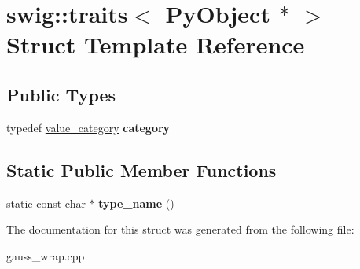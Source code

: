 \hypertarget{structswig_1_1traits_3_01_py_object_01_5_01_4}{\section{swig\-:\-:traits$<$ Py\-Object $\ast$ $>$ Struct Template Reference}
\label{structswig_1_1traits_3_01_py_object_01_5_01_4}
}
\subsection*{Public Types}
\begin{DoxyCompactItemize}
\item 
\hypertarget{structswig_1_1traits_3_01_py_object_01_5_01_4_a61e2b13476996b055b368fe035b84efc}{typedef \hyperlink{structswig_1_1value__category}{value\-\_\-category} {\bfseries category}}\label{structswig_1_1traits_3_01_py_object_01_5_01_4_a61e2b13476996b055b368fe035b84efc}

\end{DoxyCompactItemize}
\subsection*{Static Public Member Functions}
\begin{DoxyCompactItemize}
\item 
\hypertarget{structswig_1_1traits_3_01_py_object_01_5_01_4_a0d02bab40318920cce95270a10e465cd}{static const char $\ast$ {\bfseries type\-\_\-name} ()}\label{structswig_1_1traits_3_01_py_object_01_5_01_4_a0d02bab40318920cce95270a10e465cd}

\end{DoxyCompactItemize}


The documentation for this struct was generated from the following file\-:\begin{DoxyCompactItemize}
\item 
gauss\-\_\-wrap.\-cpp\end{DoxyCompactItemize}
